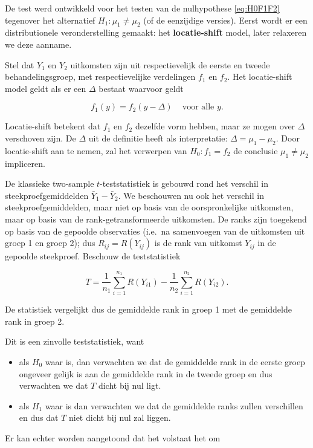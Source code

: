 \documentclass[
  12pt,dutch,coursenotes]{book}
\theoremstyle{definition}
\theoremstyle{definition}
\theoremstyle{definition}
\theoremstyle{definition}
\theoremstyle{remark}
\begin{document}
De test werd ontwikkeld voor het testen van de nulhypothese \eqref{eq:H0F1F2} tegenover het alternatief \(H_1: \mu_1\neq \mu_2\) (of de eenzijdige versies). Eerst wordt er een distributionele veronderstelling gemaakt: het \textbf{locatie-shift} model, later relaxeren we deze aanname.

Stel dat \(Y_1\) en \(Y_2\) uitkomsten zijn uit respectievelijk de eerste en tweede behandelingsgroep, met respectievelijke verdelingen \(f_1\) en \(f_2\). Het locatie-shift model geldt als er een \(\Delta\) bestaat waarvoor geldt

\[
   f_1(y)=f_2(y-\Delta) \;\;\;\text{ voor alle } y.
 \]

Locatie-shift betekent dat \(f_1\) en \(f_2\) dezelfde vorm hebben, maar ze mogen over \(\Delta\) verschoven zijn.
De \(\Delta\) uit de definitie heeft als interpretatie: \(\Delta = \mu_1-\mu_2\).
Door locatie-shift aan te nemen, zal het verwerpen van \(H_0: f_1=f_2\) de conclusie \(\mu_1\neq \mu_2\) impliceren.

De klassieke two-sample \(t\)-teststatistiek is gebouwd rond het verschil in steekproefgemiddelden \(\bar{Y}_1-\bar{Y}_2\). We beschouwen nu ook het verschil in steekproefgemiddelden, maar niet op basis van de oorspronkelijke uitkomsten, maar op basis van de rank-getransformeerde uitkomsten. De ranks zijn toegekend op basis van de gepoolde observaties (i.e.~na samenvoegen van de uitkomsten uit groep 1 en groep 2); dus \(R_{ij}=R(Y_{ij})\) is de rank van uitkomst \(Y_{ij}\) in de gepoolde steekproef.
Beschouw de teststatistiek

\[
  T = \frac{1}{n_1}\sum_{i=1}^{n_1} R(Y_{i1}) - \frac{1}{n_2}\sum_{i=1}^{n_2} R(Y_{i2}) .
\]

De statistiek vergelijkt dus de gemiddelde rank in groep 1 met de gemiddelde rank in groep 2.

Dit is een zinvolle teststatistiek, want

\begin{itemize}
\item
  als \(H_0\) waar is, dan verwachten we dat de gemiddelde rank in de eerste groep ongeveer gelijk is aan de gemiddelde rank in de tweede groep en dus verwachten we dat \(T\) dicht bij nul ligt.
\item
  als \(H_1\) waar is dan verwachten we dat de gemiddelde ranks zullen verschillen en dus dat \(T\) niet dicht bij nul zal liggen.
\end{itemize}

Er kan echter worden aangetoond dat het volstaat het om
\end{document}
